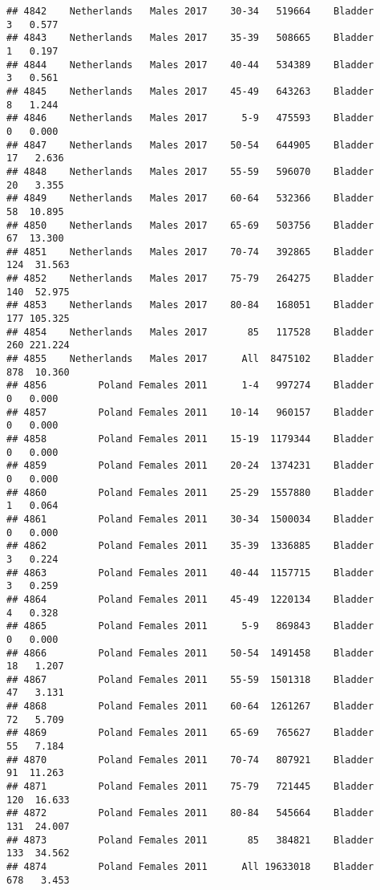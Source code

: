 \documentclass[
]{article}
\begin{document}
\begin{verbatim}
## 4842    Netherlands   Males 2017    30-34   519664    Bladder      3   0.577
## 4843    Netherlands   Males 2017    35-39   508665    Bladder      1   0.197
## 4844    Netherlands   Males 2017    40-44   534389    Bladder      3   0.561
## 4845    Netherlands   Males 2017    45-49   643263    Bladder      8   1.244
## 4846    Netherlands   Males 2017      5-9   475593    Bladder      0   0.000
## 4847    Netherlands   Males 2017    50-54   644905    Bladder     17   2.636
## 4848    Netherlands   Males 2017    55-59   596070    Bladder     20   3.355
## 4849    Netherlands   Males 2017    60-64   532366    Bladder     58  10.895
## 4850    Netherlands   Males 2017    65-69   503756    Bladder     67  13.300
## 4851    Netherlands   Males 2017    70-74   392865    Bladder    124  31.563
## 4852    Netherlands   Males 2017    75-79   264275    Bladder    140  52.975
## 4853    Netherlands   Males 2017    80-84   168051    Bladder    177 105.325
## 4854    Netherlands   Males 2017       85   117528    Bladder    260 221.224
## 4855    Netherlands   Males 2017      All  8475102    Bladder    878  10.360
## 4856         Poland Females 2011      1-4   997274    Bladder      0   0.000
## 4857         Poland Females 2011    10-14   960157    Bladder      0   0.000
## 4858         Poland Females 2011    15-19  1179344    Bladder      0   0.000
## 4859         Poland Females 2011    20-24  1374231    Bladder      0   0.000
## 4860         Poland Females 2011    25-29  1557880    Bladder      1   0.064
## 4861         Poland Females 2011    30-34  1500034    Bladder      0   0.000
## 4862         Poland Females 2011    35-39  1336885    Bladder      3   0.224
## 4863         Poland Females 2011    40-44  1157715    Bladder      3   0.259
## 4864         Poland Females 2011    45-49  1220134    Bladder      4   0.328
## 4865         Poland Females 2011      5-9   869843    Bladder      0   0.000
## 4866         Poland Females 2011    50-54  1491458    Bladder     18   1.207
## 4867         Poland Females 2011    55-59  1501318    Bladder     47   3.131
## 4868         Poland Females 2011    60-64  1261267    Bladder     72   5.709
## 4869         Poland Females 2011    65-69   765627    Bladder     55   7.184
## 4870         Poland Females 2011    70-74   807921    Bladder     91  11.263
## 4871         Poland Females 2011    75-79   721445    Bladder    120  16.633
## 4872         Poland Females 2011    80-84   545664    Bladder    131  24.007
## 4873         Poland Females 2011       85   384821    Bladder    133  34.562
## 4874         Poland Females 2011      All 19633018    Bladder    678   3.453

\end{verbatim}
\end{document}
